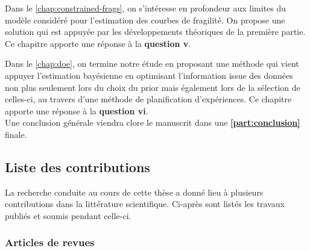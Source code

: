 \noindent
Dans le \cref{chap:constrained-frags}, on s'intéresse en profondeur aux limites du modèle considéré pour l'estimation des courbes de fragilité. On propose une solution qui est appuyée par les développements théoriques de la première partie. Ce chapitre apporte une réponse à la \textbf{question v}.

\noindent
Dans le \cref{chap:doe}, on termine notre étude en proposant une méthode qui vient appuyer l'estimation bayésienne en optimisant l'information issue des données non plus seulement  lors du choix du prior mais également lors de la sélection de celles-ci, au travers d'une méthode de planification d'expériences. Ce chapitre apporte une réponse à la \textbf{question vi}.\\


Une conclusion générale viendra clore le manuscrit dans une \textbf{\cref{part:conclusion}} finale.


\subsection{Liste des contributions}

La recherche conduite au cours de cette thèse a donné lieu à plusieurs contributions dans la littérature scientifique. Ci-après sont listés les travaux publiés et soumis pendant celle-ci.

\nocite{van_biesbroeck_design_2025,van_biesbroeck_generalized_2024,van_biesbroeck_influence_2023,van_biesbroeck_properly_2024,van_biesbroeck_reference_2024,baillie_variational_2025,baillie_bayesian_2025,van_biesbroeck_design_2025-1}


\subsubsection{Articles de revues}

